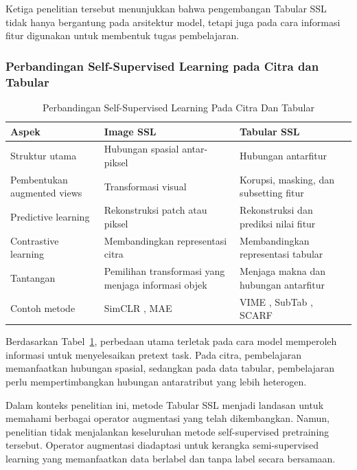 Ketiga penelitian tersebut menunjukkan bahwa pengembangan Tabular SSL tidak hanya bergantung pada arsitektur model, tetapi juga pada cara informasi fitur digunakan untuk membentuk tugas pembelajaran.

\subsubsection{Perbandingan Self-Supervised Learning pada Citra dan Tabular}

\begin{table}[!t]
\caption{Perbandingan Self-Supervised Learning Pada Citra Dan Tabular}
\label{tab:ii}
\centering
\footnotesize
\renewcommand{\arraystretch}{1.15}
\begin{tabularx}{\textwidth}{XXX}
\hline
\textbf{Aspek} & \textbf{Image SSL} & \textbf{Tabular SSL} \\
\hline
Struktur utama & Hubungan spasial antar-piksel & Hubungan antarfitur \\
Pembentukan augmented views & Transformasi visual & Korupsi, masking, dan subsetting fitur \\
Predictive learning & Rekonstruksi patch atau piksel & Rekonstruksi dan prediksi nilai fitur \\
Contrastive learning & Membandingkan representasi citra & Membandingkan representasi tabular \\
Tantangan & Pemilihan transformasi yang menjaga informasi objek & Menjaga makna dan hubungan antarfitur \\
Contoh metode & SimCLR \cite{ref2}, MAE \cite{ref3} & VIME \cite{ref5}, SubTab \cite{ref6}, SCARF \cite{ref7} \\
\hline
\end{tabularx}
\end{table}

Berdasarkan Tabel~\ref{tab:ii}, perbedaan utama terletak pada cara model memperoleh informasi untuk menyelesaikan pretext task. Pada citra, pembelajaran memanfaatkan hubungan spasial, sedangkan pada data tabular, pembelajaran perlu mempertimbangkan hubungan antaratribut yang lebih heterogen.

Dalam konteks penelitian ini, metode Tabular SSL menjadi landasan untuk memahami berbagai operator augmentasi yang telah dikembangkan. Namun, penelitian tidak menjalankan keseluruhan metode self-supervised pretraining tersebut. Operator augmentasi diadaptasi untuk kerangka semi-supervised learning yang memanfaatkan data berlabel dan tanpa label secara bersamaan.

